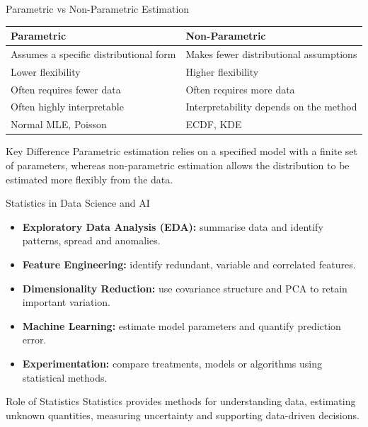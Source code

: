\documentclass{beamer}
\begin{document}
\begin{frame}{Parametric vs Non-Parametric Estimation}

\begin{center}
\begin{tabular}{p{} | p{}}
\textbf{Parametric} & \textbf{Non-Parametric} \\[0.15cm]
\hline
Assumes a specific distributional form
&
Makes fewer distributional assumptions
\\[0.25cm]
Lower flexibility
&
Higher flexibility
\\[0.25cm]
Often requires fewer data
&
Often requires more data
\\[0.25cm]
Often highly interpretable
&
Interpretability depends on the method
\\[0.25cm]
Normal MLE, Poisson
&
ECDF, KDE
\end{tabular}
\end{center}

\vspace{0.3cm}

\begin{block}{Key Difference}
Parametric estimation relies on a specified model with a finite
set of parameters, whereas non-parametric estimation allows the
distribution to be estimated more flexibly from the data.
\end{block}

\end{frame}


\begin{frame}{Statistics in Data Science and AI}

\begin{itemize}
    \item \textbf{Exploratory Data Analysis (EDA):}
          summarise data and identify patterns, spread and anomalies.
    
    \item \textbf{Feature Engineering:}
          identify redundant, variable and correlated features.
    
    \item \textbf{Dimensionality Reduction:}
          use covariance structure and PCA to retain important variation.
    
    \item \textbf{Machine Learning:}
          estimate model parameters and quantify prediction error.
    
    \item \textbf{Experimentation:}
          compare treatments, models or algorithms using statistical methods.
\end{itemize}

\begin{block}{Role of Statistics}
Statistics provides methods for understanding data, estimating
unknown quantities, measuring uncertainty and supporting
data-driven decisions.
\end{block}

\end{frame}
\end{document}
